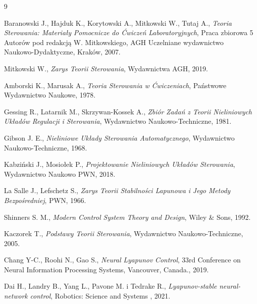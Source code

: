 \documentclass{article}
\begin{document}
\newpage
\begin{thebibliography}{9}

  Baranowski J., Hajduk K., Korytowski A., Mitkowski W., Tutaj A.,
  \emph{Teoria Sterowania: Materiały Pomocnicze do Ćwiczeń Laboratoryjnych},
  Praca zbiorowa 5 Autorów pod redakcją W. Mitkowskiego,
  AGH Uczelniane wydawnictwo Naukowo-Dydaktyczne,
  Kraków, 2007.

    Mitkowski W.,
    \emph{Zarys Teorii Sterowania},
    Wydawnictwa AGH,
    2019.

  Amborski K., Marusak A.,
  \emph{Teoria Sterowania w Ćwiczeniach},
  Państwowe Wydawnictwo Naukowe,
  1978.

  Gessing R., Latarnik M., Skrzywan-Kossek A.,
  \emph{Zbiór Zadań z Teorii Nieliniowych Układów Regulacji i Sterowania},
  Wydawnictwo Naukowo-Techniczne,
  1981.

  Gibson J. E.,
  \emph{Nieliniowe Układy Sterowania Automatycznego},
  Wydawnictwo Naukowo-Techniczne,
  1968.

  Kabziński J., Mosiołek P.,
  \emph{Projektowanie Nieliniowych Układów Sterowania},
  Wydawnictwo Naukowo PWN,
  2018.

  La Salle J., Lefschetz S.,
  \emph{Zarys Teorii Stabilności Lapunowa i Jego Metody Bezpośredniej},
  PWN,
  1966.

  Shinners S. M.,
  \emph{Modern Control System Theory and Design},
  Wiley \& Sons,
  1992.

  Kaczorek T.,
  \emph{Podstawy Teorii Sterowania},
  Wydawnictwo Naukowo-Techniczne,
  2005.

  Chang Y-C., Roohi N., Gao S., 
  \emph{Neural Lyapunov Control},
  33rd Conference on Neural Information Processing Systems, Vancouver, Canada.,
  2019.

  Dai H., Landry B., Yang L., Pavone M. i Tedrake R.,
  \emph{Lyapunov-stable neural-network control},
  Robotics: Science and Systems ,
  2021.

\end{thebibliography}
\end{document}
